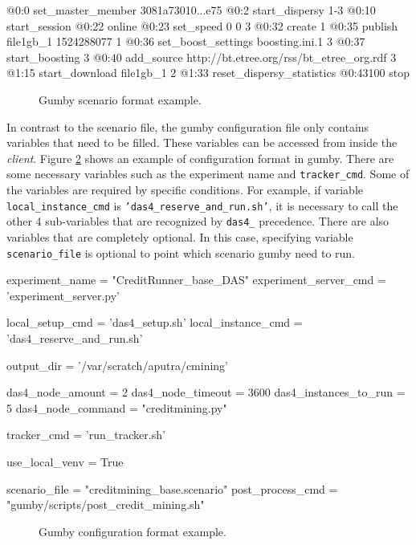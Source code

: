 \begin{verbbox}
@0:0 set_master_member 3081a73010...e75
@0:2 start_dispersy {1-3}
@0:10 start_session
@0:22 online
@0:23 set_speed 0 0 {3}
@0:32 create {1}
@0:35 publish file1gb_1 1524288077 {1}
@0:36 set_boost_settings boosting.ini.1 {3}
@0:37 start_boosting {3}
@0:40 add_source http://bt.etree.org/rss/bt_etree_org.rdf {3}
@1:15 start_download file1gb_1 {2}
@1:33 reset_dispersy_statistics
@0:43100 stop
\end{verbbox}

\begin{figure}[h]
	\fbox{\theverbbox}
	\caption{Gumby scenario format example.}
	\label{fig:gumbyscenario}
\end{figure}

In contrast to the scenario file, the gumby configuration file only contains variables that need to be filled. These variables can be accessed from inside the \textit{client}. Figure \ref{fig:gumbyconf} shows an example of configuration format in gumby. There are some necessary variables such as the experiment name and \texttt{tracker\_cmd}. Some of the variables are required by specific conditions. For example, if variable \texttt{local\_instance\_cmd} is \texttt{'das4\_reserve\_and\_run.sh'}, it is necessary to call the other 4 sub-variables that are recognized by \texttt{das4\_} precedence. There are also variables that are completely optional. In this case, specifying variable \texttt{scenario\_file} is optional to point which scenario gumby need to run.

\begin{verbbox}
experiment_name = "CreditRunner_base_DAS"
experiment_server_cmd = 'experiment_server.py'

local_setup_cmd = 'das4_setup.sh'
local_instance_cmd = 'das4_reserve_and_run.sh'

output_dir = '/var/scratch/aputra/cmining'

das4_node_amount = 2
das4_node_timeout = 3600
das4_instances_to_run = 5
das4_node_command = "creditmining.py"

tracker_cmd = 'run_tracker.sh'

use_local_venv = True

scenario_file = "creditmining_base.scenario"
post_process_cmd = "gumby/scripts/post_credit_mining.sh"
\end{verbbox}

\begin{figure}[h!]
	\fbox{\theverbbox}
	\caption{Gumby configuration format example.}
	\label{fig:gumbyconf}
\end{figure}

